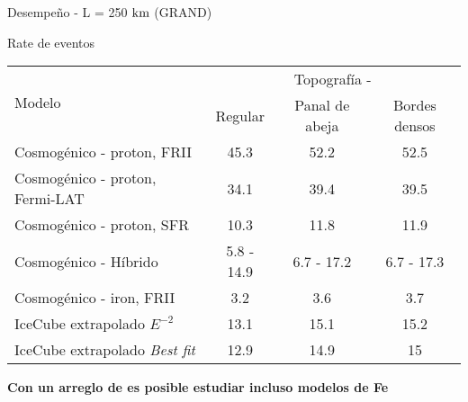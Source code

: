 \begin{frame}{Desempe\~no - L = 250 ${\rm km}$ (GRAND)} 
	\begin{block}{Rate de eventos}
		\begin{center}
		\renewcommand{\arraystretch}{1.3}
		\footnotesize
		\begin{tabular}{lccc}
			\hline
			\multirow{2}{*}{Modelo} & \multicolumn{3}{c}{Topograf\'ia - \cant{L=250}{km}} \\
			&   Regular &   Panal de abeja &   Bordes densos \\
			\hline
			Cosmogénico - proton, FRII &    45.3 &             52.2 &            52.5 \\
			Cosmogénico - proton, Fermi-LAT &     34.1 &             39.4 &            39.5 \\
			Cosmogénico - proton, SFR &     10.3 &             11.8 &            11.9 \\
			Cosmogénico - H\'ibrido &      5.8 - 14.9 &      6.7 - 17.2 &       6.7 - 17.3 \\
			\alert{Cosmogénico - iron, FRII} &     \alert{3.2} &              \alert{3.6} &             \alert{3.7} \\
			IceCube extrapolado $E^{-2}$ &      13.1 &             15.1 &            15.2 \\
			IceCube extrapolado \emph{Best fit}  &      12.9 &             14.9 &            15   \\
			\hline
		\end{tabular}
		\end{center}
	\end{block}
	\begin{exampleblock}{}
	\centering
	 \textbf{Con un arreglo de  es posible estudiar incluso modelos de Fe}
	\end{exampleblock}
\end{frame}



